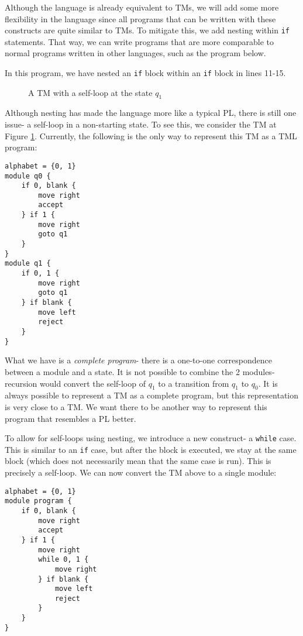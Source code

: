 Although the language is already equivalent to TMs, we will add some more flexibility in the language since all programs that can be written with these constructs are quite similar to TMs. To mitigate this, we add nesting within \texttt{if} statements. That way, we can write programs that are more comparable to normal programs written in other languages, such as the program below.

In this program, we have nested an \texttt{if} block within an \texttt{if} block in lines 11-15.

\begin{figure}[htb]
    \centering
    \caption{A TM with a self-loop at the state $q_1$}
    \label{fig:self-loop-TM}
\end{figure}
Although nesting has made the language more like a typical PL, there is still one issue- a self-loop in a non-starting state. To see this, we consider the TM at Figure \ref{fig:self-loop-TM}. Currently, the following is the only way to represent this TM as a TML program:
\begin{lstlisting}[language=TML]
alphabet = {0, 1}
module q0 {
    if 0, blank {
        move right
        accept
    } if 1 {
        move right
        goto q1
    }
}
module q1 {
    if 0, 1 {
        move right
        goto q1
    } if blank {
        move left
        reject
    }
}
\end{lstlisting}
What we have is a \emph{complete program}- there is a one-to-one correspondence between a module and a state. It is not possible to combine the 2 modules- recursion would convert the self-loop of $q_1$ to a transition from $q_1$ to $q_0$. It is always possible to represent a TM as a complete program, but this representation is very close to a TM. We want there to be another way to represent this program that resembles a PL better.

To allow for self-loops using nesting, we introduce a new construct- a \texttt{while} case. This is similar to an \texttt{if} case, but after the block is executed, we stay at the same block (which does not necessarily mean that the same case is run). This is precisely a self-loop. We can now convert the TM above to a single module:
\begin{lstlisting}[language=TML]
alphabet = {0, 1}
module program {
    if 0, blank {
        move right
        accept
    } if 1 {
        move right
        while 0, 1 {
            move right
        } if blank {
            move left
            reject
        }
    }
}
\end{lstlisting}

